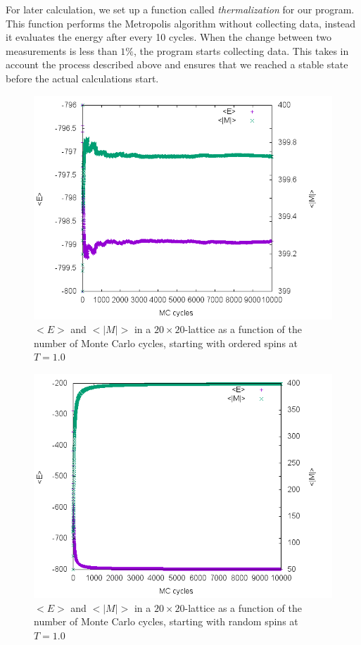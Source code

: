 \documentclass[10pt,a4paper]{article}
\begin{document}
For later calculation, we set up a function called \emph{thermalization} for our program. This function performs the Metropolis algorithm without collecting data, instead it evaluates the energy after every 10 cycles. When the change between two measurements is less than $1\%$, the program starts collecting data. This takes in account the process described above and ensures that we reached a stable state before the actual calculations start.
\begin{figure}[h]
	\includegraphics[width=\textwidth]{a1o.png}
	\caption{$<E>$ and $<|M|>$ in a $20\times 20$-lattice as a function of the number of Monte Carlo cycles\label{b_chi}, starting with ordered spins at $T=1.0$}
\end{figure}
\begin{figure}[h]
	\includegraphics[width=\textwidth]{a1r.png}
	\caption{$<E>$ and $<|M|>$ in a $20\times 20$-lattice as a function of the number of Monte Carlo cycles\label{b_chi}, starting with random spins at $T=1.0$}
\end{figure}
\end{document}

